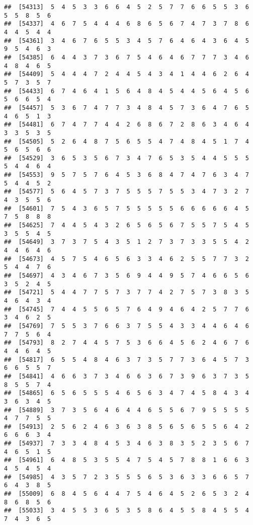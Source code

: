 \documentclass[
]{book}
\begin{document}
\begin{verbatim}
##  [54313]  5  4  5  3  3  6  6  4  5  2  5  7  7  6  6  5  5  3  6  5  5  8  5  6
##  [54337]  4  6  7  5  4  4  4  6  8  6  5  6  7  4  7  3  7  8  6  4  4  5  4  4
##  [54361]  3  4  6  7  6  5  5  3  4  5  7  6  4  6  4  3  6  4  5  9  5  4  6  3
##  [54385]  6  4  4  3  7  3  6  7  5  4  6  4  6  7  7  7  3  4  6  4  8  4  6  5
##  [54409]  5  4  4  4  7  2  4  4  5  4  3  4  1  4  4  6  2  6  4  5  7  3  5  7
##  [54433]  6  7  4  6  4  1  5  6  4  8  4  5  4  4  5  6  4  5  6  5  6  6  5  4
##  [54457]  5  3  6  7  4  7  7  3  4  8  4  5  7  3  6  4  7  6  5  4  6  5  1  3
##  [54481]  6  7  4  7  7  4  4  2  6  8  6  7  2  8  6  3  4  6  4  3  3  5  3  5
##  [54505]  5  2  6  4  8  7  5  6  5  5  4  7  4  8  4  5  1  7  4  5  6  5  6  6
##  [54529]  3  6  5  3  5  6  7  3  4  7  6  5  3  5  4  4  5  5  5  5  4  4  6  4
##  [54553]  9  5  7  5  7  6  4  5  3  6  8  4  7  4  7  6  3  4  7  5  4  4  5  2
##  [54577]  5  6  4  5  7  3  7  5  5  5  7  5  5  3  4  7  3  2  7  4  3  5  5  6
##  [54601]  7  5  4  3  6  5  7  5  5  5  5  5  6  6  6  6  6  4  5  7  5  8  8  8
##  [54625]  7  4  4  5  4  3  2  6  5  6  5  6  7  5  5  7  5  4  5  3  5  5  4  5
##  [54649]  3  7  3  7  5  4  3  5  1  2  7  3  7  3  3  5  5  4  2  4  4  6  4  6
##  [54673]  4  5  7  5  4  6  5  6  3  3  4  6  2  5  5  7  7  3  2  5  4  4  7  6
##  [54697]  4  3  4  6  7  3  5  6  9  4  4  9  5  7  4  6  6  5  6  3  5  2  4  5
##  [54721]  5  4  4  7  7  5  7  3  7  7  4  2  7  5  7  3  8  3  5  4  6  4  3  4
##  [54745]  7  4  4  5  5  6  5  7  6  4  9  4  6  4  2  5  7  7  6  3  4  6  2  5
##  [54769]  7  5  5  3  7  6  6  3  7  5  5  4  3  3  4  4  6  4  6  7  7  5  6  4
##  [54793]  8  2  7  4  4  5  7  5  3  6  6  4  5  6  2  4  6  7  6  4  4  6  4  5
##  [54817]  6  5  5  4  8  4  6  3  7  3  5  7  7  3  6  4  5  7  3  6  6  5  5  7
##  [54841]  4  6  6  3  7  3  4  6  6  3  6  7  3  9  6  3  7  3  5  8  5  5  7  4
##  [54865]  6  5  6  5  5  5  4  6  5  6  3  4  7  4  5  8  4  3  4  3  6  3  4  5
##  [54889]  3  7  3  5  6  4  6  4  4  6  5  5  6  7  9  5  5  5  5  4  7  7  5  5
##  [54913]  2  5  6  2  4  6  3  6  3  8  5  6  5  6  5  5  6  4  2  6  6  6  3  4
##  [54937]  7  3  3  4  8  4  5  3  4  6  3  8  3  5  2  3  5  6  7  4  6  5  1  5
##  [54961]  6  4  8  5  3  5  5  4  7  5  4  5  7  8  8  1  6  6  3  4  5  4  5  4
##  [54985]  4  3  5  7  2  3  5  5  5  6  5  3  6  3  3  6  6  5  7  6  4  3  8  5
##  [55009]  6  8  4  5  6  4  4  7  5  4  6  4  5  2  6  5  3  2  4  8  6  8  5  6
##  [55033]  3  4  5  5  3  6  5  3  5  8  6  4  5  5  8  4  5  5  4  7  4  3  6  5

\end{verbatim}
\end{document}
